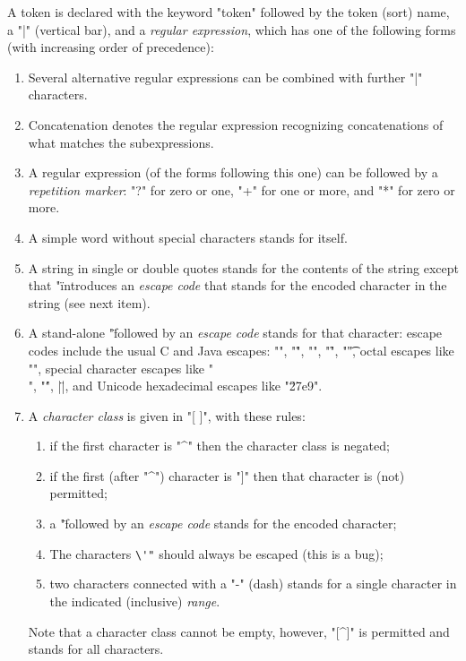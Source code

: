 \documentclass[11pt]{article} %
\begin{document}
\begin{manual}\label{man:token}
  A token is declared with the keyword "token" followed by the token (sort) name, a "|" (vertical
  bar), and a \emph{regular expression}, which has one of the following forms (with increasing order
  of precedence):
  \begin{enumerate}

  \item Several alternative regular expressions can be combined with further "|" characters.

  \item Concatenation denotes the regular expression recognizing concatenations of what matches the
    subexpressions.

  \item A regular expression (of the forms following this one) can be followed by a \emph{repetition
      marker}: "?" for zero or one, "+" for one or more, and "*" for zero or more.

  \item A simple word without special characters stands for itself.

  \item A string in single or double quotes stands for the contents of the string except that "\"
    introduces an \emph{escape code} that stands for the encoded character in the string (see next item).

  \item A stand-alone "\" followed by an \emph{escape code} stands for that character: escape codes
    include the usual C and Java escapes: "\n", "\r", "\a", "\f", "\t", octal escapes like "",
    special character escapes like "\\", "\'", \hacsc|\"|, and Unicode hexadecimal escapes like
    "\u27e9".

  \item A \emph{character class} is given in "[ ]", with these rules:
   \begin{enumerate}
    \item if the first character is "^" then the character class is negated;
    \item if the first (after "^") character is "]" then that character is (not) permitted;
    \item a "\" followed by an \emph{escape code} stands for the encoded character;
    \item The characters \verb|\'"| should always be escaped (this is a bug);
    \item two characters connected with a "-" (dash) stands for a single character in the indicated
      (inclusive) \emph{range}.
    \end{enumerate}
    Note that a character class cannot be empty, however, "[^]" is permitted and stands for all
    characters.
    


\end{enumerate}
\end{manual}
\end{document}

